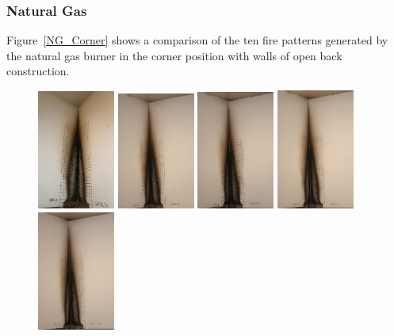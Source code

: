 \documentclass[twoside]{uocthesis}
\begin{document}
\subsubsection{Natural Gas}

Figure~\ref{NG_Corner} shows a comparison of the ten fire patterns generated by the natural gas burner in the corner position with walls of open back construction. 

\begin{figure}[p]
	\includegraphics[width=1.0in]{../Figures/GBNG34_P5150482}
	\includegraphics[width=1.0in]{../Figures/GBNG35_IMG_9166}
	\includegraphics[width=1.0in]{../Figures/GBNG36_IMG_9181}
	\includegraphics[width=1.0in]{../Figures/GBNG37_IMG_9194}
	\includegraphics[width=1.0in]{../Figures/GBNG38_IMG_9208} \\


\end{figure}
\end{document}

